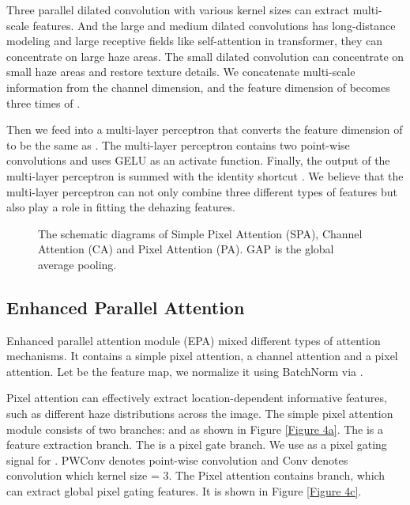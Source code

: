 \documentclass[10pt,twocolumn,letterpaper]{article}
\begin{document}
Three parallel dilated convolution with various kernel sizes can extract multi-scale features. And the large and medium dilated convolutions has long-distance modeling and large receptive fields like self-attention in transformer, they can concentrate on large haze areas. The small dilated convolution can concentrate on small haze areas and restore texture details. We concatenate multi-scale information from the channel dimension, and the feature dimension of  becomes three times of . 


Then we feed  into a multi-layer perceptron that converts the feature dimension of  to be the same as . The multi-layer perceptron contains two point-wise convolutions and uses GELU as an activate function. Finally, the output of the multi-layer perceptron is summed with the identity shortcut . We believe that the multi-layer perceptron can not only combine three different types of features but also play a role in fitting the dehazing features.


\begin{figure}[t]
\centering
{}
\caption{The schematic diagrams of Simple Pixel Attention (SPA), Channel Attention (CA) and Pixel Attention (PA). GAP is the global average pooling. }
\end{figure}
\subsection{Enhanced Parallel Attention}
Enhanced parallel attention module (EPA) mixed different types of attention mechanisms. It contains a simple pixel attention, a channel attention and a pixel attention. Let  be the feature map, we normalize it using BatchNorm via .

Pixel attention can effectively extract location-dependent informative features, such as different haze distributions across the image.  The simple pixel attention module consists of two branches:  and  as shown in Figure \ref{Figure 4a}. The  is a feature extraction branch. The  is a pixel gate branch. We use  as a pixel gating signal for . 
PWConv denotes point-wise convolution and Conv denotes convolution which kernel size = 3. The Pixel attention contains  branch, which can extract global pixel gating features. It is shown in Figure \ref{Figure 4c}.
\end{document}
